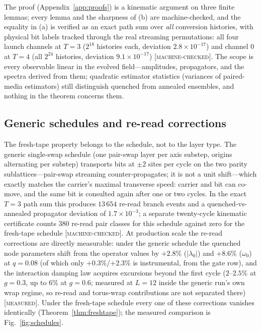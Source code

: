 \documentclass[aps,prd,twocolumn,superscriptaddress,nofootinbib,floatfix]{revtex4-2}
\newcommand{\evM}{\textnormal{\textsc{[machine-checked]}}}
\newcommand{\evX}{\textnormal{\textsc{[measured]}}}
\begin{document}
The proof (Appendix~\ref{app:proofs}) is a kinematic argument on three
finite lemmas; every lemma and the sharpness
of (b) are machine-checked, and the equality in (a) is verified as an
exact path sum over \emph{all} conversion histories, with physical bit
labels tracked through the real streaming permutations: all four launch
channels at $T=3$ ($2^{18}$ histories each, deviation
$2.8\times10^{-17}$) and channel $0$ at $T=4$ (all $2^{24}$ histories,
deviation $9.1\times10^{-17}$) \evM{}. The scope is every observable
linear in the evolved field---amplitudes, propagators, and the spectra
derived from them; quadratic estimator statistics (variances of
paired-media estimators) still distinguish quenched from annealed
ensembles, and nothing in the theorem concerns them.

\subsection{Generic schedules and re-read corrections}
\label{sec:generic}

The fresh-tape property belongs to the schedule, not to the layer type.
The generic single-swap schedule (one pair-swap layer per axis substep,
origins alternating per substep) transports bits at $\pm2$ sites per
cycle on the two parity sublattices---pair-swap streaming
counter-propagates; it is not a unit shift---which exactly matches the
carrier's maximal transverse speed: carrier and bit can co-move, and the
same bit is consulted again after one or two cycles. In the exact
$T=3$ path sum this produces $13\,654$ re-read branch events and a
quenched-vs-annealed propagator deviation of $1.7\times10^{-3}$; a
separate twenty-cycle kinematic certificate counts $380$ re-read pair
classes for this schedule against zero for the fresh-tape schedule
\evM{}. At production scale
the re-read corrections are directly measurable: under the generic
schedule the quenched node parameters shift from the operator values by
$+2.8\%$ ($|\lambda_0|$) and $+8.6\%$ ($\omega_0$) at $q=0.08$ (of
which only $+0.3\%$/$+2.3\%$ is instrumental, from the gate row), and
the interaction damping law acquires excursions beyond the first cycle
($2$--$2.5\%$ at $g=0.3$, up to $6\%$ at $g=0.6$; measured at $L=12$
inside the generic run's own wrap regime, so re-read and torus-wrap
contributions are not separated there) \evX{}. Under the fresh-tape schedule every one of these
corrections vanishes identically (Theorem~\ref{thm:freshtape}); the
measured comparison is Fig.~\ref{fig:schedules}.
\end{document}
